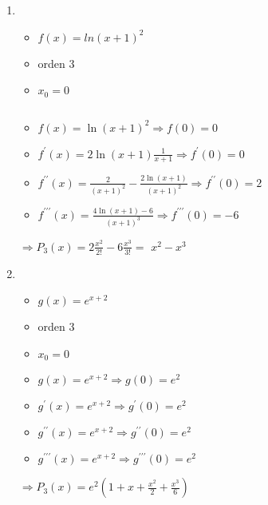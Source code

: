 \documentclass[../practica_05.tex]{subfiles}
\begin{document}
    \begin{enumerate}
        \item 
            \begin{itemize}
                \item $f(x) = ln(x+1)^2$
                \item orden 3
                \item $x_0 = 0$
            \end{itemize}

            $ $

            \begin{itemize}
                \item $f(x) = \ln(x+1)^2 \Rightarrow f(0) = 0$
                \item $f^\prime(x) = 2\ln(x+1)\frac{1}{x+1} \Rightarrow f^\prime(0) = 0$
                \item $f^{\prime\prime}(x) = \frac{2}{(x+1)^2} - \frac{2\ln(x+1)}{(x+1)^2} \Rightarrow f^{\prime\prime}(0) = 2$
                \item $f^{\prime\prime\prime}(x) = \frac{4\ln(x+1)-6}{(x+1)^3} \Rightarrow f^{\prime\prime\prime}(0) = -6$
            \end{itemize}

            $\Rightarrow P_3(x) = 2\frac{x^2}{2!} - 6 \frac{x^3}{3!} = $
            $ x^2 - x^3 $

        \item 
            \begin{itemize}
                \item $g(x) = e^{x+2}$
                \item orden 3
                \item $x_0 = 0$
            \end{itemize}

            \begin{itemize}
                \item $g(x) = e^{x+2} \Rightarrow g(0) = e^2$
                \item $g^\prime(x) = e^{x+2} \Rightarrow g^\prime(0) = e^2$
                \item $g^{\prime\prime}(x) = e^{x+2} \Rightarrow g^{\prime\prime}(0) = e^2$
                \item $g^{\prime\prime\prime}(x) = e^{x+2} \Rightarrow g^{\prime\prime\prime}(0) = e^2$
            \end{itemize}

            $\Rightarrow P_3(x) = e^2 (1 + x + \frac{x^2}{2} + \frac{x^3}{6})$


\end{enumerate}
\end{document}
